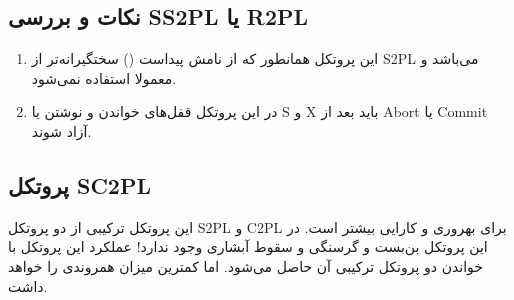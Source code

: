 \documentclass[a4paper]{article}
\begin{document}
\begin{LTR}
    \begin{table}[h]
        \begin{RTL}
            \caption{زمانبندی $S_{8}$}
        \end{RTL}
        \centering
    \end{table}
\end{LTR}

\subsection*{نکات و بررسی SS2PL یا R2PL}

\begin{enumerate}
    \item این پروتکل همانطور که از نامش پیداست () سختگیرانه‌تر
    از S2PL می‌باشد و معمولا استفاده نمی‌شود.
    \item در این پروتکل قفل‌های خواندن و نوشتن یا S و X باید بعد از Abort یا
    Commit آزاد شوند.
\end{enumerate}

\subsection{پروتکل SC2PL}

این پروتکل ترکیبی از دو پروتکل S2PL و C2PL برای بهروری و کارایی بیشتر است. در
این پروتکل بن‌بست و گرسنگی و سقوط آبشاری وجود ندارد! عملکرد این پروتکل با خواندن
دو پروتکل ترکیبی آن حاصل می‌شود. اما کمترین میزان همروندی را خواهد داشت.

\begin{LTR}
    \begin{table}[h]
        \begin{RTL}
            \caption{زمانبندی $S_{9}$}
        \end{RTL}
        \centering
    \end{table}
\end{LTR}
\end{document}
